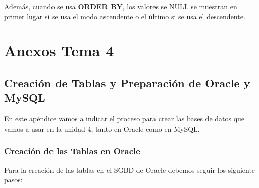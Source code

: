Además, cuando se usa \textbf{ORDER BY}, los valores se NULL se muestran en primer lugar si se usa el modo ascendente o el último si se usa el descendente.


\appendix

\chapter{Anexos Tema 4}

\section{Creación de Tablas y Preparación de Oracle y MySQL}
En este apéndice vamos a indicar el proceso para crear las bases de datos que vamos a usar en la unidad 4, tanto en Oracle como en MySQL.

\subsection{Creación de las Tablas en Oracle}
Para la creación de las tablas en el SGBD de Oracle debemos seguir los siguiente pasos:

